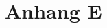 %
%
\glsresetall

\let\raggedsection\centering 
\chapter{Anhang E}\label{chap.appendix_mediaUseQuestionnaire}
\let\raggedsection\raggedright 

